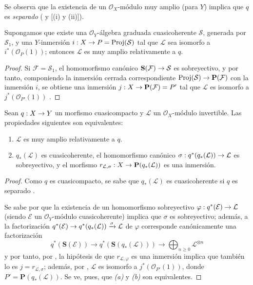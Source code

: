 \documentclass[oneside,10pt]{amsart}
\makeatletter
\renewcommand{\geq}{\geqslant}
\newcommand{\ega@arrow}[2]{\mathchoice{#1}{#2}{#2}{#2}}
\renewcommand{\to}{\ega@arrow{\longrightarrow}{\rightarrow}}
\newcommand{\oldpage}[2][]{\marginnote{\normalfont\footnotesize\textbf{#1}~|~#2}\ignorespaces}
\let\EGAOriginalLabel\label
\renewcommand{\label}[1]{\phantomsection\EGAOriginalLabel{#1}}
\makeatother
\begin{document}
Se observa que la existencia de un $\mathcal{O}_X$-módulo muy amplio (para $Y$) implica que $q$ es \emph{separado} ( y [(i) y (ii)]).

\begin{corollary}[4.4.3]
\label{II.4.4.3-fr}
Supongamos que existe una $\mathcal{O}_Y$-álgebra graduada cuasicoherente $\mathcal{S}$, generada por $\mathcal{S}_1$, y una $Y$-inmersión $i:X\to P=\operatorname{Proj}(\mathcal{S})$ tal que $\mathcal{L}$ sea isomorfo a $i^*(\mathcal{O}_P(1))$;
entonces $\mathcal{L}$ es muy amplio relativamente a $q$.
\end{corollary}

\begin{proof}
Si $\mathcal{F}=\mathcal{S}_1$, el homomorfismo canónico $\mathbf{S}(\mathcal{F})\to\mathcal{S}$ es sobreyectivo, y por tanto, componiendo la inmersión cerrada correspondiente $\operatorname{Proj}(\mathcal{S})\to\mathbf{P}(\mathcal{F})$  con la inmersión $i$, se obtiene una inmersión $j:X\to\mathbf{P}(\mathcal{F})=P'$ tal que $\mathcal{L}$ es isomorfo a $j^*(\mathcal{O}_{P'}(1))$ .
\end{proof}

\begin{proposition}[4.4.4]
\label{II.4.4.4-fr}
Sean $q:X\to Y$ un morfismo cuasicompacto y $\mathcal{L}$ un $\mathcal{O}_X$-módulo invertible.
Las propiedades siguientes son equivalentes:
\begin{enumerate}
  \item[\rm{(a)}] $\mathcal{L}$ es muy amplio relativamente a $q$.
  \item[\rm{(b)}] $q_*(\mathcal{L})$ es cuasicoherente, el homomorfismo canónico $\sigma:q^*(q_*(\mathcal{L}))\to\mathcal{L}$ es sobreyectivo, y el morfismo $r_{\mathcal{L},\sigma}:X\to\mathbf{P}(q_*(\mathcal{L}))$ es una inmersión.
\end{enumerate}
\end{proposition}

\begin{proof}
Como $q$ es cuasicompacto, se sabe que $q_*(\mathcal{L})$ es cuasicoherente si $q$ es separado .

\oldpage[II]{80}
Se sabe por  que la existencia de un homomorfismo sobreyectivo $\varphi:q^*(\mathcal{E})\to\mathcal{L}$ (siendo $\mathcal{E}$ un $\mathcal{O}_Y$-módulo cuasicoherente) implica que $\sigma$ es sobreyectivo;
además, a la factorización $q^*(\mathcal{E})\to q^*(q_*(\mathcal{L}))\xrightarrow{\sigma}\mathcal{L}$ de $\varphi$ corresponde canónicamente una factorización
\[
  q^*(\mathbf{S}(\mathcal{E}))
    \longrightarrow q^*(\mathbf{S}(q_*(\mathcal{L})))
    \longrightarrow\bigoplus_{n\geq0}\mathcal{L}^{\otimes n}
\]
y por tanto, por , la hipótesis de que $r_{\mathcal{L},\varphi}$ es una inmersión implica que también lo es $j=r_{\mathcal{L},\sigma}$;
además, por , $\mathcal{L}$ es isomorfo a $j^*(\mathcal{O}_{P'}(1))$, donde $P'=\mathbf{P}(q_*(\mathcal{L}))$.
Se ve, pues, que \emph{(a)} y \emph{(b)} son equivalentes.
\end{proof}
\end{document}
